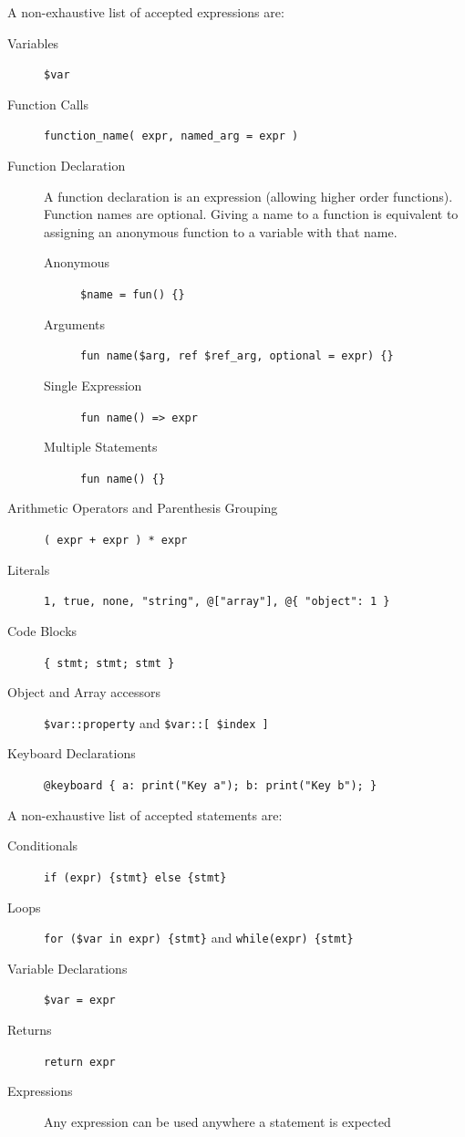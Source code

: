 \documentclass[a4paper,UKenglish,cleveref, autoref]{oasics-v2019}
\begin{document}
A non-exhaustive list of accepted expressions are:
\begin{description}
    \item[Variables] \verb|$var|
    \item[Function Calls] \verb|function_name( expr, named_arg = expr )|
    \item[Function Declaration] A function declaration is an expression (allowing higher order functions). Function names are optional. Giving a name to a function is equivalent to assigning an anonymous function to a variable with that name.
        \begin{description}
            \item[Anonymous] \verb|$name = fun() {}|
            \item[Arguments] \verb|fun name($arg, ref $ref_arg, optional = expr) {}|
            \item[Single Expression] \verb|fun name() => expr|
            \item[Multiple Statements] \verb|fun name() {}|
        \end{description}
        
    \item[Arithmetic Operators and Parenthesis Grouping] \verb|( expr + expr ) * expr|
    \item[Literals] \verb|1, true, none, "string", @["array"], @{ "object": 1 }|
    \item[Code Blocks] \verb|{ stmt; stmt; stmt }|
    \item[Object and Array accessors] \verb|$var::property| and \verb|$var::[ $index ]|
    \item[Keyboard Declarations] \verb|@keyboard { a: print("Key a"); b: print("Key b"); }|
\end{description}

A non-exhaustive list of accepted statements are:
\begin{description}
    \item[Conditionals] \verb|if (expr) {stmt} else {stmt}|
    \item[Loops] \verb|for ($var in expr) {stmt}| and \verb|while(expr) {stmt}|
    \item[Variable Declarations] \verb|$var = expr|
    \item[Returns] \verb|return expr|
    \item[Expressions] Any expression can be used anywhere a statement is expected
\end{description}
\end{document}
